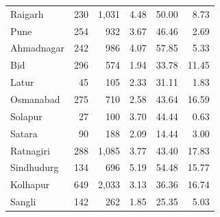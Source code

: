 \documentclass[11pt,a4paper]{report}
\begin{document}
\begin{longtable}{lrrrrr}
Raigarh & 230 & 1,031 & 4.48 & 50.00 & 8.73 \\
Pune & 254 & 932 & 3.67 & 46.46 & 2.69 \\
Ahmadnagar & 242 & 986 & 4.07 & 57.85 & 5.33 \\
Bid & 296 & 574 & 1.94 & 33.78 & 11.45 \\
Latur & 45 & 105 & 2.33 & 31.11 & 1.83 \\
Osmanabad & 275 & 710 & 2.58 & 43.64 & 16.59 \\
Solapur & 27 & 100 & 3.70 & 44.44 & 0.63 \\
Satara & 90 & 188 & 2.09 & 14.44 & 3.00 \\
Ratnagiri & 288 & 1,085 & 3.77 & 43.40 & 17.83 \\
Sindhudurg & 134 & 696 & 5.19 & 54.48 & 15.77 \\
Kolhapur & 649 & 2,033 & 3.13 & 36.36 & 16.74 \\
Sangli & 142 & 262 & 1.85 & 25.35 & 5.03 \\
\end{longtable}\endgroup
\begingroup\footnotesize\setlength{\tabcolsep}{4pt}
\end{document}
